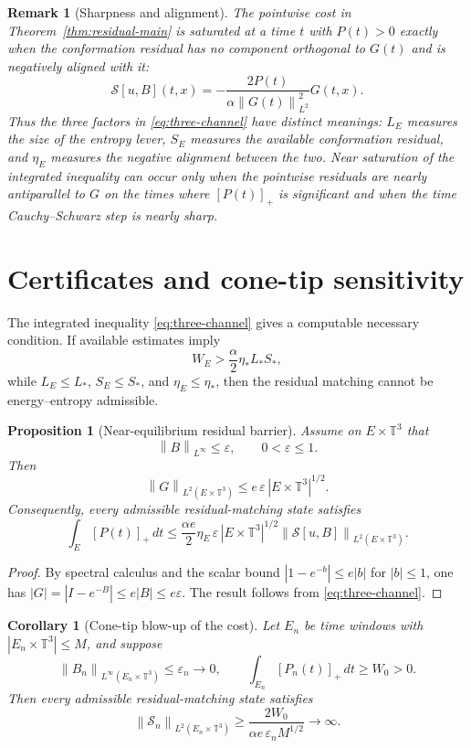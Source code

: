 \documentclass[11pt]{article}
\numberwithin{equation}{section}
\newtheorem{proposition}[theorem]{Proposition}
\newtheorem{corollary}[theorem]{Corollary}
\newtheorem{remark}[theorem]{Remark}
\newcommand{\T}{\mathbb T}
\newcommand{\Id}{I}
\newcommand{\calS}{\mathcal S}
\newcommand{\norm}[1]{\left\lVert #1\right\rVert}
\begin{document}
\begin{remark}[Sharpness and alignment]
The pointwise cost in Theorem~\ref{thm:residual-main} is saturated at a time
\(t\) with \(P(t)>0\) exactly when the conformation residual has no component
orthogonal to \(G(t)\) and is negatively aligned with it:
\[
  \calS[u,B](t,x)
  =
  -\frac{2P(t)}{\alpha\norm{G(t)}_{L^2}^2}G(t,x).
\]
Thus the three factors in \eqref{eq:three-channel} have distinct meanings:
\(L_E\) measures the size of the entropy lever, \(S_E\) measures the available
conformation residual, and \(\eta_E\) measures the negative alignment between
the two.  Near saturation of the integrated inequality can occur only when
the pointwise residuals are nearly antiparallel to \(G\) on the times where
\([P(t)]_+\) is significant and when the time Cauchy--Schwarz step is nearly
sharp.
\end{remark}

\section{Certificates and cone-tip sensitivity}

The integrated inequality \eqref{eq:three-channel} gives a computable
necessary condition.  If available estimates imply
\[
  W_E>\frac{\alpha}{2}\eta_*L_*S_*,
\]
while \(L_E\le L_*\), \(S_E\le S_*\), and \(\eta_E\le\eta_*\), then the
residual matching cannot be energy--entropy admissible.

\begin{proposition}[Near-equilibrium residual barrier]
\label{prop:near-equilibrium}
Assume on \(E\times\T^3\) that
\[
  \norm{B}_{L^\infty}\le\varepsilon,\qquad 0<\varepsilon\le1.
\]
Then
\[
  \norm{G}_{L^2(E\times\T^3)}
  \le e\,\varepsilon\,|E\times\T^3|^{1/2}.
\]
Consequently, every admissible residual-matching state satisfies
\[
  \int_E[P(t)]_+\,dt
  \le
  \frac{\alpha e}{2}
  \eta_E\,\varepsilon\,|E\times\T^3|^{1/2}
  \norm{\calS[u,B]}_{L^2(E\times\T^3)}.
\]
\end{proposition}

\begin{proof}
By spectral calculus and the scalar bound
\(|1-e^{-b}|\le e|b|\) for \(|b|\le1\), one has
\(|G|=|\Id-e^{-B}|\le e|B|\le e\varepsilon\).  The result follows from
\eqref{eq:three-channel}.
\end{proof}

\begin{corollary}[Cone-tip blow-up of the cost]
Let \(E_n\) be time windows with \(|E_n\times\T^3|\le M\), and suppose
\[
  \norm{B_n}_{L^\infty(E_n\times\T^3)}\le\varepsilon_n\to0,\qquad
  \int_{E_n}[P_n(t)]_+\,dt\ge W_0>0 .
\]
Then every admissible residual-matching state satisfies
\[
  \norm{\calS_n}_{L^2(E_n\times\T^3)}
  \ge
  \frac{2W_0}{\alpha e\,\varepsilon_nM^{1/2}}
  \to\infty .
\]
\end{corollary}
\end{document}
